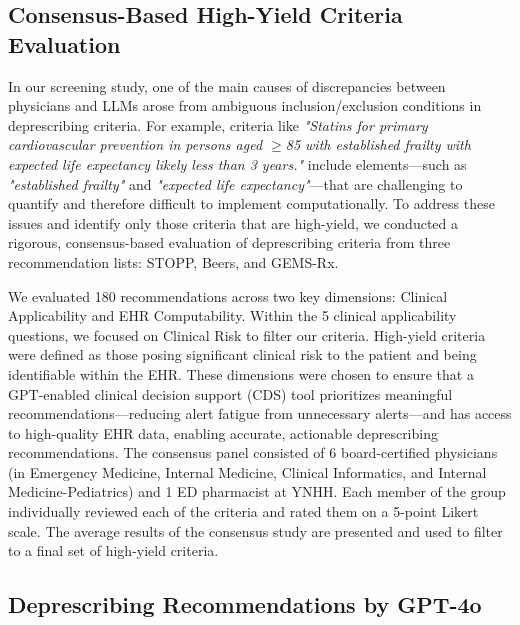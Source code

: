 \subsection{Consensus-Based High-Yield Criteria Evaluation}

In our screening study\citep{SAEM24Abstracts2024}, one of the main causes of discrepancies between physicians and LLMs arose from ambiguous inclusion/exclusion conditions in deprescribing criteria. For example, criteria like \emph{"Statins for primary cardiovascular prevention in persons aged $\geq$85 with established frailty with expected life expectancy likely less than 3 years."} include elements—such as \emph{"established frailty"} and \emph{"expected life expectancy"}—that are challenging to quantify and therefore difficult to implement computationally. To address these issues and identify only those criteria that are high-yield, we conducted a rigorous, consensus-based evaluation of deprescribing criteria from three recommendation lists: STOPP\citep{omahonySTOPPSTARTCriteria2023}, Beers\citep{bythe2023americangeriatricssocietybeerscriteriarupdateexpertpanelAmericanGeriatricsSociety2023}, and GEMS-Rx\citep{skainsGeriatricEmergencyMedication2024}. 

We evaluated 180 recommendations across two key dimensions: Clinical Applicability and EHR Computability. Within the 5 clinical applicability questions, we focused on Clinical Risk to filter our criteria. High-yield criteria were defined as those posing significant clinical risk to the patient and being identifiable within the EHR. These dimensions were chosen to ensure that a GPT-enabled clinical decision support (CDS) tool prioritizes meaningful recommendations—reducing alert fatigue from unnecessary alerts—and has access to high-quality EHR data, enabling accurate, actionable deprescribing recommendations. The consensus panel consisted of 6 board-certified physicians (in Emergency Medicine, Internal Medicine, Clinical Informatics, and Internal Medicine-Pediatrics) and 1 ED pharmacist at YNHH. Each member of the group individually reviewed each of the criteria and rated them on a 5-point Likert scale. The average results of the consensus study are presented and used to filter to a final set of high-yield criteria. 

\subsection{Deprescribing Recommendations by GPT-4o}

